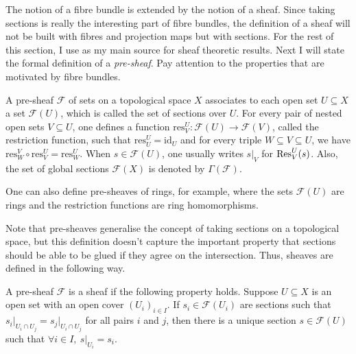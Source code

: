 The notion of a fibre bundle is extended by the notion of a sheaf.
Since taking sections is really the interesting part of fibre bundles, the
definition of a sheaf will not be built with fibres and projection maps
but with sections. For the rest of this section, I use \cite{gathmann} as
my main source for sheaf theoretic results. Next I will state the formal
definition of a \emph{pre-sheaf}. Pay attention to the properties that are
motivated by fibre bundles.
\begin{defin}
  A pre-sheaf $\mathscr{F}$ of sets on a topological space $X$ associates
  to each open set $U\subseteq X$ a set $\mathscr{F}(U)$, which is called
  the set of sections over $U$. For every pair of nested open sets
  $V\subseteq U$, one defines a function
  $\text{res}_{V}^{U}:\mathscr{F}(U)\to\mathscr{F}(V)$,
  called the restriction function, such that $\text{res}_{U}^{U}
  =\text{id}_{U}$ and for every triple $W\subseteq V\subseteq U$, we have
  $\text{res}_{W}^{V}\circ\text{res}_{V}^{U}=\text{res}_{W}^{U}$.
  When $s\in\mathscr{F}(U)$, one usually writes $s\vert_{V}$ for
  $\operatorname{Res}_{V}^{U}(s)$. Also, the set of global sections $\mathscr{F}(X)$
  is denoted by $\Gamma(\mathscr{F})$.

  One can also define pre-sheaves of rings, for example, where the sets
  $\mathscr{F}(U)$ are rings and the restriction functions are
  ring homomorphisms.
\end{defin}
Note that pre-sheaves generalise the concept of taking sections on a
topological space, but this definition doesn't capture the important property
that sections should be able to be glued if they agree on the intersection.
Thus, sheaves are defined in the following way.
\begin{defin}
  A pre-sheaf $\mathscr{F}$ is a sheaf if the following property holds.
  Suppose $U\subseteq X$ is an open set with an open cover $(U_{i})_{i\in I}$.
  If $s_{i}\in\mathscr{F}(U_{i})$ are sections such that
  $s_{i}\vert_{U_{i}\cap U_{j}}=s_{j}\vert_{U_{i}\cap U_{j}}$ for all pairs $i$
  and $j$, then there is a unique section $s\in\mathscr{F}(U)$ such that
  $\forall i\in I,\ s\vert_{U_{i}}=s_{i}$.
\end{defin}
